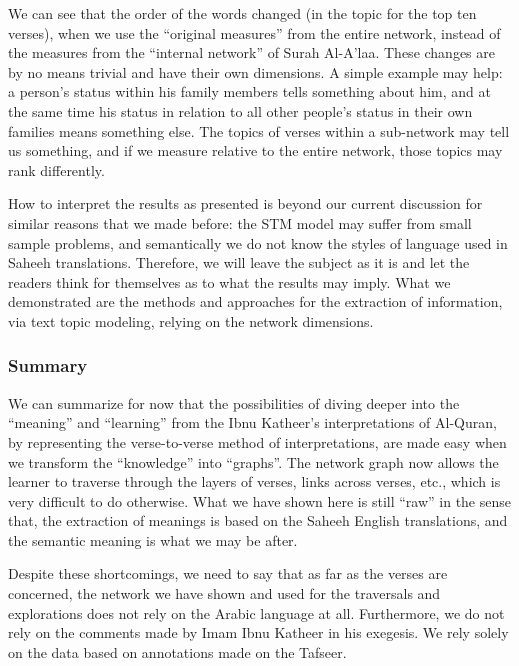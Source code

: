 \documentclass[
]{article}
\begin{document}
\normalsize

We can see that the order of the words changed (in the topic for the top ten verses), when we use the ``original measures'' from the entire network, instead of the measures from the ``internal network'' of Surah Al-A'laa. These changes are by no means trivial and have their own dimensions. A simple example may help: a person's status within his family members tells something about him, and at the same time his status in relation to all other people's status in their own families means something else. The topics of verses within a sub-network may tell us something, and if we measure relative to the entire network, those topics may rank differently.

How to interpret the results as presented is beyond our current discussion for similar reasons that we made before: the STM model may suffer from small sample problems, and semantically we do not know the styles of language used in Saheeh translations. Therefore, we will leave the subject as it is and let the readers think for themselves as to what the results may imply. What we demonstrated are the methods and approaches for the extraction of information, via text topic modeling, relying on the network dimensions.

\hypertarget{summary-1}{%
\subsubsection{Summary}\label{summary-1}}

We can summarize for now that the possibilities of diving deeper into the ``meaning'' and ``learning'' from the Ibnu Katheer's interpretations of Al-Quran, by representing the verse-to-verse method of interpretations, are made easy when we transform the ``knowledge'' into ``graphs''. The network graph now allows the learner to traverse through the layers of verses, links across verses, etc., which is very difficult to do otherwise. What we have shown here is still ``raw'' in the sense that, the extraction of meanings is based on the Saheeh English translations, and the semantic meaning is what we may be after.

Despite these shortcomings, we need to say that as far as the verses are concerned, the network we have shown and used for the traversals and explorations does not rely on the Arabic language at all. Furthermore, we do not rely on the comments made by Imam Ibnu Katheer in his exegesis. We rely solely on the data based on annotations made on the Tafseer.
\end{document}
